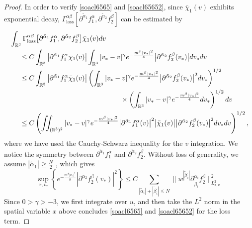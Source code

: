 \documentclass[reqno]{amsart}
\numberwithin{equation}{section}
\numberwithin{equation}{section}
\begin{document}
\begin{proof}
		In order to verify \eqref{soacl6565} and \eqref{soacl65652}, since \( \bar{\chi}_1(v) \) exhibits exponential decay, \( \Gamma_{\text{loss}}^{\alpha \beta} [\partial^{\tilde{\alpha}_1}f^{\alpha}_1, \partial^{\tilde{\alpha}_2}f^{\beta}_2] \) can be estimated by
		\begin{align*}
		&\int_{\mathbb{R}^3} \Gamma_{\text{loss}}^{\alpha \beta} \big[\partial^{\tilde{\alpha}_1}f^{\alpha}_1, \partial^{\tilde{\alpha}_2}f^{\beta}_2\big] \bar{\chi}_1(v) dv\\
			&\hspace{0.5cm}\le C \int_{\mathbb{R}^3} \big|\partial^{\tilde{\alpha}_1}f^{\alpha}_1\bar{\chi}_1(v)\big| \int_{\mathbb{R}^3} |v_* - v|^\gamma e^{-\frac{m^{\beta}|v_*|^2}{4}} \big|\partial^{\tilde{\alpha}_2}f^{\beta}_2(v_*)\big|dv_*dv\\
			&\hspace{0.5cm}\le C \int_{\mathbb{R}^3} \big|\partial^{\tilde{\alpha}_1}f^{\alpha}_1\bar{\chi}_1(v)\big| \left( \int_{\mathbb{R}^3} |v_* - v|^\gamma e^{-\frac{m^{\beta}|v_*|^2}{4}} \big|\partial^{\tilde{\alpha}_2}f^{\beta}_2(v_*)\big|^2 dv_* \right)^{1/2} \\
			&\hspace{5.6cm}\times \left( \int_{\mathbb{R}^3} |v_* - v|^\gamma e^{-\frac{m^{\beta}|v_*|^2}{4}} dv_* \right)^{1/2}dv\\
			&\hspace{0.5cm}\le C \left( \iint_{(\mathbb{R}^3)^2} |v_* - v|^\gamma e^{-\frac{m^{\beta}|v_*|^2}{4}} \big|\partial^{\tilde{\alpha}_1}f^{\alpha}_1(v)\big|^2 \big|\bar{\chi}_1(v)\big|\big|\partial^{\tilde{\alpha}_2}f^{\beta}_2(v_*)\big|^2 dv_*dv \right)^{1/2},
		\end{align*}
		where we have used the Cauchy-Schwarz inequality for the \( v \) integration. We notice the symmetry between $\partial^{\tilde{\alpha}_1}f^{\alpha}_1$ and $\partial^{\tilde{\alpha}_2}f^{\beta}_2$. Without loss of generality, we assume $\left|\tilde{\alpha}_1 \right| \geq \frac{N}{2}$ , which gives
		\[
		\sup_{x,v_*} \left\{ e^{-\frac{m^{\beta}|v_*|^2}{8}} |\partial^{\tilde{\alpha}_2}f^{\beta}_2(v_*)|^2 \right\} \le C \sum_{| \tilde{\alpha}_i |+| \tilde{\beta}_i | \le N} \big\| w^{| \tilde{\beta}_i |} \partial_{\tilde{\beta}_i}^{\tilde{\alpha}_i}f^{\beta}_2 \big\|^2_{L^{2}_{x,v}}
		\]
		Since \( 0>\gamma > -3 \), we first integrate over \( u \), and then take the \( L^2 \) norm in the spatial variable \( x \) above concludes \eqref{soacl6565} and \eqref{soacl65652} for the loss term.
		

\end{proof}
\end{document}
